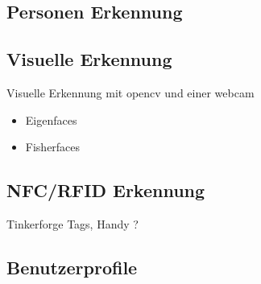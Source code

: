 \subsection{Personen Erkennung}
\subsection{Visuelle Erkennung}
Visuelle Erkennung mit opencv und einer webcam
 \begin{itemize}
      \item Eigenfaces 
      \item Fisherfaces 
\end{itemize}

\subsection{NFC/RFID Erkennung}
Tinkerforge Tags, Handy ?

\subsection{Benutzerprofile}